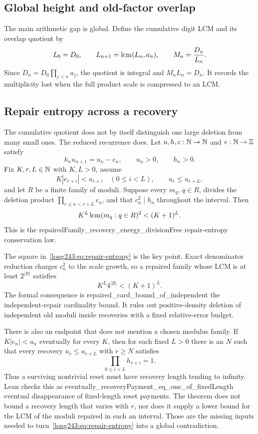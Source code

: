 \documentclass[11pt]{article}
\begin{document}
\subsection{Global height and old-factor overlap}

The main arithmetic gap is global.  Define the cumulative digit LCM and its
overlap quotient by
\[
 L_0=D_0,\qquad L_{n+1}=\operatorname{lcm}(L_n,a_n),\qquad M_n=\frac{D_n}{L_n}.
\]
Since $D_n=D_0\prod_{j<n}a_j$, the quotient is integral and
$M_nL_n=D_n$.  It records the multiplicity lost when the full product scale
is compressed to an LCM.

\subsection{Repair entropy across a recovery}

The cumulative quotient does not by itself distinguish one large deletion
from many small ones.  The reduced recurrence does.  Let $u,h,c:\mathbb{N}\to\mathbb{N}$ and
$e:\mathbb{N}\to\mathbb{Z}$ satisfy
\[
 h_nu_{n+1}=u_n-e_n,
 \qquad u_n>0,
 \qquad h_n>0.
\]
Fix $K,r,L\in\mathbb{N}$ with $K,L>0$, assume
\[
 K|e_{r+i}|<u_{r+i}\quad(0\le i<L),
 \qquad u_r\le u_{r+L},
\]
and let $R$ be a finite family of moduli.  Suppose every $m_q$, $q\in R$,
divides the deletion product $\prod_{r\le n<r+L}c_n$, and that
$c_n^2\mid h_n$ throughout the interval.  Then
\begin{equation}\label{long243:eq:repair-entropy}
 K^L\lcm(m_q:q\in R)^2<(K+1)^L.
\end{equation}
This is the
      {repairedFamily_recovery_energy_divisionFree}
      {repair-entropy conservation law}.

The square in~\eqref{long243:eq:repair-entropy} is the key point.  Exact denominator
reduction charges $c_n^2$ to the scale growth, so a repaired family whose LCM
is at least $2^{|R|}$ satisfies
\[
 K^L4^{|R|}<(K+1)^L.
\]
The formal consequence is
      {repaired_card_bound_of_independent}
      {the independent-repair cardinality bound}.
It rules out positive-density deletion of independent old moduli inside
recoveries with a fixed relative-error budget.

There is also an endpoint that does not mention a chosen modulus family.  If
$K|e_n|<u_n$ eventually for every $K$, then for each fixed $L>0$ there is an
$N$ such that every recovery $u_r\le u_{r+L}$ with $r\ge N$ satisfies
\[
 \prod_{0\le i<L}h_{r+i}=1.
\]
Thus a surviving nontrivial reset must have recovery length tending to
infinity.  Lean checks this as
      {eventually_recoveryPayment_eq_one_of_fixedLength}
      {eventual disappearance of fixed-length reset payments}.
The theorem does not bound a recovery length that varies with $r$, nor does it
supply a lower bound for the LCM of the moduli repaired in such an interval.
Those are the missing inputs needed to turn~\eqref{long243:eq:repair-entropy} into a
global contradiction.
\end{document}
